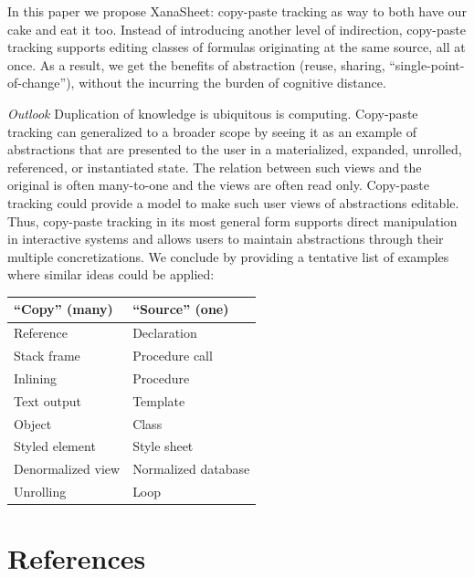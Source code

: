 \documentclass[11pt,]{article}
\begin{document}
In this paper we propose XanaSheet: copy-paste tracking as way to both
have our cake and eat it too. Instead of introducing another level of
indirection, copy-paste tracking supports editing classes of formulas
originating at the same source, all at once. As a result, we get the
benefits of abstraction (reuse, sharing, ``single-point-of-change''),
without the incurring the burden of cognitive distance.

\emph{Outlook} Duplication of knowledge is ubiquitous is computing.
Copy-paste tracking can generalized to a broader scope by seeing it as
an example of abstractions that are presented to the user in a
materialized, expanded, unrolled, referenced, or instantiated state. The
relation between such views and the original is often many-to-one and
the views are often read only. Copy-paste tracking could provide a model
to make such user views of abstractions editable. Thus, copy-paste
tracking in its most general form supports direct manipulation in
interactive systems and allows users to maintain abstractions through
their multiple concretizations. We conclude by providing a tentative
list of examples where similar ideas could be applied:

\begin{longtable}[c]{@{}ll@{}}
\toprule
``Copy'' (many) & ``Source'' (one)\tabularnewline
\midrule
\endhead
Reference & Declaration\tabularnewline
Stack frame & Procedure call\tabularnewline
Inlining & Procedure\tabularnewline
Text output & Template\tabularnewline
Object & Class\tabularnewline
Styled element & Style sheet\tabularnewline
Denormalized view & Normalized database\tabularnewline
Unrolling & Loop\tabularnewline
\bottomrule
\end{longtable}

\section{References}\label{references}
\end{document}
